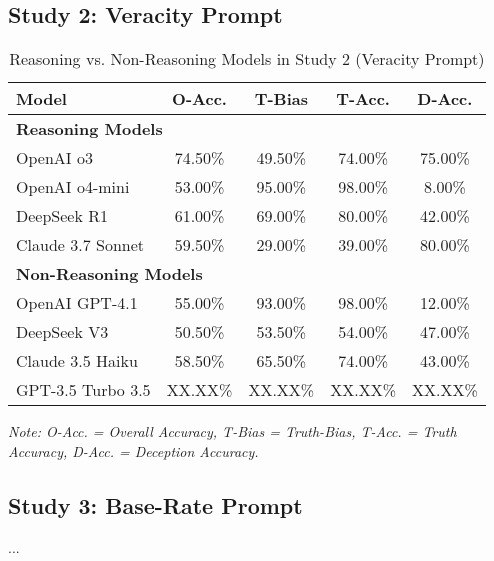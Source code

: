 \documentclass{article}
\begin{document}
\subsection{Study 2: Veracity Prompt}

\begin{table}[ht]
\centering
\caption{Reasoning vs. Non-Reasoning Models in Study 2 (Veracity Prompt)}
\begin{tabular}{lcccc}
\toprule
\textbf{Model} & \textbf{O-Acc.} & \textbf{T-Bias} & \textbf{T-Acc.} & \textbf{D-Acc.} \\
\midrule
\multicolumn{5}{l}{\textbf{Reasoning Models}} \\
OpenAI o3 & 74.50\% & 49.50\% & 74.00\% & 75.00\% \\
OpenAI o4-mini & 53.00\% & 95.00\% & 98.00\% & 8.00\% \\
DeepSeek R1 & 61.00\% & 69.00\% & 80.00\% & 42.00\% \\
Claude 3.7 Sonnet & 59.50\% & 29.00\% & 39.00\% & 80.00\% \\
\midrule
\multicolumn{5}{l}{\textbf{Non-Reasoning Models}} \\
OpenAI GPT-4.1 & 55.00\% & 93.00\% & 98.00\% & 12.00\% \\
DeepSeek V3 & 50.50\% & 53.50\% & 54.00\% & 47.00\% \\
Claude 3.5 Haiku & 58.50\% & 65.50\% & 74.00\% & 43.00\% \\
GPT-3.5 Turbo 3.5 & XX.XX\% & XX.XX\% & XX.XX\% & XX.XX\% \\
\bottomrule
\end{tabular}
\begin{minipage}{0.7\linewidth}
\vspace{0.05in}
\footnotesize
\textit{Note: O-Acc. = Overall Accuracy, T-Bias = Truth-Bias, T-Acc. = Truth Accuracy, D-Acc. = Deception Accuracy.}
\end{minipage}
\label{tab:study1_model_comparison}
\end{table}

\subsection{Study 3: Base-Rate Prompt}

...
\end{document}
